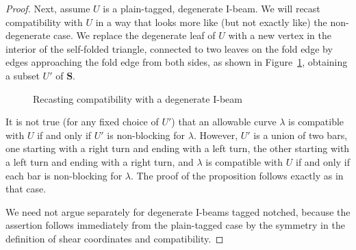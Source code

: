 \documentclass{amsart}
\theoremstyle{definition}
\theoremstyle{remark}
\numberwithin{equation}{section}
\newcommand{\0}{{\mathbf{0}}}
\renewcommand{\S}{\mathbf{S}}
\begin{document}
\begin{proof}
Next, assume $U$ is a plain-tagged, degenerate I-beam.
We will recast compatibility with $U$ in a way that looks more like (but not exactly like) the non-degenerate case.
We replace the degenerate leaf of $U$ with a new vertex in the interior of the self-folded triangle, connected to two leaves on the fold edge by edges approaching the fold edge from both sides, as shown in Figure~\ref{degen recast}, obtaining a subset $U'$ of $\S$.
\begin{figure}
\qquad{}
\caption{Recasting compatibility with a degenerate I-beam}
\label{degen recast}
\end{figure}
It is not true (for any fixed choice of $U'$) that an allowable curve $\lambda$ is compatible with $U$ if and only if $U'$ is non-blocking for $\lambda$.
However, $U'$ is a union of two bars, one starting with a right turn and ending with a left turn, the other starting with a left turn and ending with a right turn, and $\lambda$ is compatible with $U$ if and only if each bar is non-blocking for $\lambda$.
The proof of the proposition follows exactly as in that case.

We need not argue separately for degenerate I-beams tagged notched, because the assertion follows immediately from the plain-tagged case by the symmetry in the definition of shear coordinates and compatibility.


\end{proof}
\end{document}
